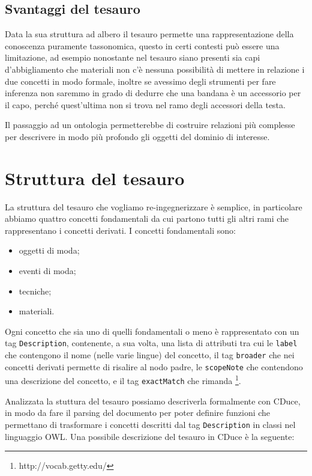 \subsection{Svantaggi del tesauro}
Data la sua struttura ad albero il tesauro permette una rappresentazione della conoscenza puramente tassonomica, questo in certi contesti può essere una limitazione, ad esempio nonostante nel tesauro siano presenti sia capi d'abbigliamento che materiali non c'è nessuna possibilità di mettere in relazione i due concetti in modo formale, inoltre se avessimo degli strumenti per fare inferenza non saremmo in grado di dedurre che una bandana è un accessorio per il capo, perché quest'ultima non si trova nel ramo degli accessori della testa.

Il passaggio ad un ontologia permetterebbe di costruire relazioni più complesse per descrivere in modo più profondo gli oggetti del dominio di interesse.
\section{Struttura del tesauro}
La struttura del tesauro che vogliamo re-ingegnerizzare è semplice, in particolare abbiamo quattro concetti fondamentali da cui partono tutti gli altri rami che rappresentano i concetti derivati. I concetti fondamentali sono:
\begin{itemize}
	\item oggetti di moda;
	\item eventi di moda;
	\item tecniche;
	\item materiali.
\end{itemize}
Ogni concetto che sia uno di quelli fondamentali o meno è rappresentato con un tag \verb|Description|, contenente, a sua volta, una lista di attributi tra cui le \verb|label| che contengono il nome (nelle varie lingue) del concetto, il tag \verb|broader| che nei concetti derivati permette di risalire al nodo padre, le \verb|scopeNote| che contendono una descrizione del concetto, e il tag \verb|exactMatch| che rimanda \footnote{http://vocab.getty.edu/}.

Analizzata la stuttura del tesauro possiamo descriverla formalmente con CDuce, in modo da fare il parsing del documento per poter definire funzioni che permettano di trasformare i concetti descritti dal tag \verb|Description| in classi nel linguaggio OWL. Una possibile descrizione del tesauro in CDuce è la seguente:
